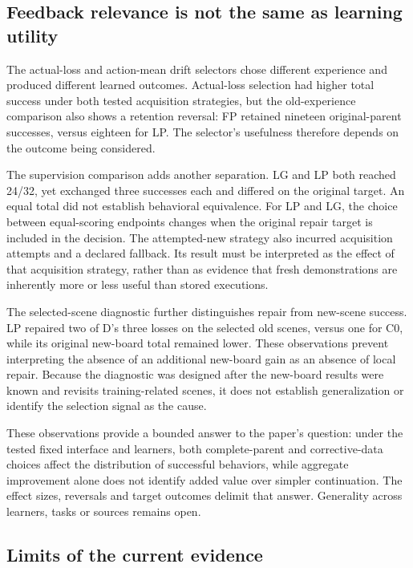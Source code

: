 \documentclass[10pt,letterpaper]{article}
\begin{document}
\subsection{Feedback relevance is not the same as learning
utility}\label{feedback-relevance-is-not-the-same-as-learning-utility}

The actual-loss and action-mean drift selectors chose different
experience and produced different learned outcomes. Actual-loss
selection had higher total success under both tested acquisition
strategies, but the old-experience comparison also shows a retention
reversal: FP retained nineteen original-parent successes, versus
eighteen for LP. The selector's usefulness therefore depends on the
outcome being considered.

The supervision comparison adds another separation. LG and LP both
reached 24/32, yet exchanged three successes each and differed on the
original target. An equal total did not establish behavioral
equivalence. For LP and LG, the choice between equal-scoring endpoints
changes when the original repair target is included in the decision. The
attempted-new strategy also incurred acquisition attempts and a declared
fallback. Its result must be interpreted as the effect of that
acquisition strategy, rather than as evidence that fresh demonstrations
are inherently more or less useful than stored executions.

The selected-scene diagnostic further distinguishes repair from
new-scene success. LP repaired two of D's three losses on the selected
old scenes, versus one for C0, while its original new-board total
remained lower. These observations prevent interpreting the absence of
an additional new-board gain as an absence of local repair. Because the
diagnostic was designed after the new-board results were known and
revisits training-related scenes, it does not establish generalization
or identify the selection signal as the cause.

These observations provide a bounded answer to the paper's question:
under the tested fixed interface and learners, both complete-parent and
corrective-data choices affect the distribution of successful behaviors,
while aggregate improvement alone does not identify added value over
simpler continuation. The effect sizes, reversals and target outcomes
delimit that answer. Generality across learners, tasks or sources
remains open.

\subsection{Limits of the current
evidence}\label{limits-of-the-current-evidence}
\end{document}
